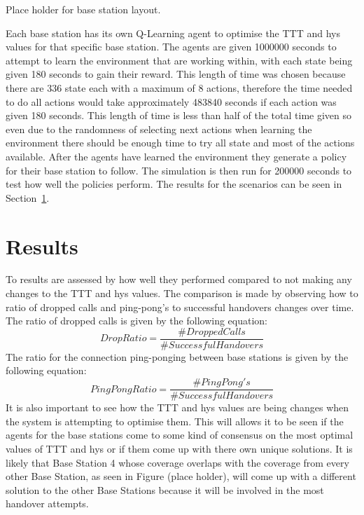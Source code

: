 Place holder for base station layout.

Each base station has its own Q-Learning agent to optimise the TTT and hys values for that specific base station. The agents are given 1000000 seconds to attempt to learn the environment that are working within, with each state being given 180 seconds to gain their reward. This length of time was chosen because there are 336 state each with a maximum of 8 actions, therefore the time needed to do all actions would take approximately 483840 seconds if each action was given 180 seconds. This length of time is less than half of the total time given so even due to the randomness of selecting next actions when learning the environment there should be enough time to try all state and most of the actions available. After the agents have learned the environment they generate a policy for their base station to follow. The simulation is then run for 200000 seconds to test how well the policies perform. The results for the scenarios can be seen in Section~\ref{results}.
\section{Results}\label{results}
To results are assessed by how well they performed compared to not making any changes to the TTT and hys values. The comparison is made by observing how to ratio of dropped calls and ping-pong's to successful handovers changes over time. The ratio of dropped calls is given by the following equation:
\begin{equation}\label{eq:drop}
Drop Ratio = \frac{\#Dropped Calls}{\#Successful Handovers}
\end{equation}
The ratio for the connection ping-ponging between base stations is given by the following equation:
\begin{equation}\label{eq:ping}
PingPong Ratio = \frac{\#PingPong's}{\#Successful Handovers}
\end{equation}
It is also important to see how the TTT and hys values are being changes when the system is attempting to optimise them. This will allows it to be seen if the agents for the base stations come to some kind of consensus on the most optimal values of TTT and hys or if them come up with there own unique solutions. It is likely that Base Station 4 whose coverage overlaps with the coverage from every other Base Station, as seen in Figure (place holder), will come up with a different solution to the other Base Stations because it will be involved in the most handover attempts.

